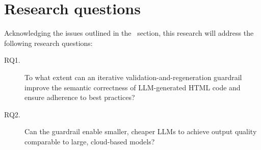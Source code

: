 \section{Research questions}
\label{sec:research-questions}

Acknowledging the issues outlined in the~ section, this research will address the following research questions:

\begin{description}
	\item[RQ1.]\label{item:rq1} To what extent can an iterative validation-and-regeneration guardrail improve the semantic correctness of LLM-generated HTML code and ensure adherence to best practices?
	\item[RQ2.]\label{item:rq2} Can the guardrail enable smaller, cheaper LLMs to achieve output quality comparable to large, cloud-based models?
\end{description}

